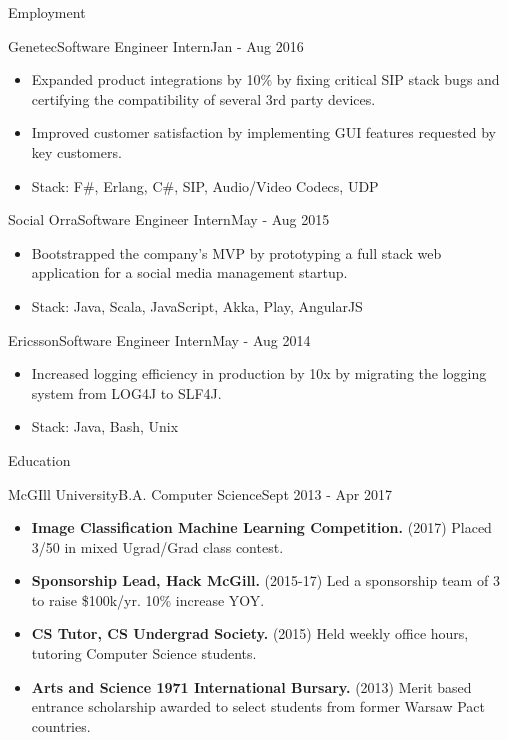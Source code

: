 \documentclass[]{muchicv}
\begin{document}
\begin{cvsection}{Employment}
		\begin{cvsubsection}{Genetec}{Software Engineer Intern}{Jan - Aug 2016}
			\begin{itemize}
				\item Expanded product integrations by 10\% by fixing critical SIP stack bugs and certifying the compatibility of several 3rd party devices.
				\item Improved customer satisfaction by implementing GUI features requested by key customers.
				\item Stack: F\#, Erlang, C\#, SIP, Audio/Video Codecs, UDP
			\end{itemize}
		\end{cvsubsection}

		\begin{cvsubsection}{Social Orra}{Software Engineer Intern}{May - Aug 2015}
			\begin{itemize}
				\item Bootstrapped the company's MVP by prototyping a full stack web application for a social media management startup.
				\item Stack: Java, Scala, JavaScript, Akka, Play, AngularJS
			\end{itemize}
		\end{cvsubsection}
		
		\begin{cvsubsection}{Ericsson}{Software Engineer Intern}{May - Aug 2014}
			\begin{itemize}
				\item Increased logging efficiency in production by 10x by migrating the logging system from LOG4J to SLF4J.
				\item Stack: Java, Bash, Unix
			\end{itemize}
		\end{cvsubsection}
	\end{cvsection}
	
	\begin{cvsection}{Education}
		\begin{cvsubsection}{McGIll University}{B.A. Computer Science}{Sept 2013 - Apr 2017}
			\begin{itemize}
				\item \textbf{Image Classification Machine Learning Competition.} (2017) Placed 3/50 in mixed Ugrad/Grad class contest.
				\item \textbf{Sponsorship Lead, Hack McGill.} (2015-17) Led a sponsorship team of 3 to raise \$100k/yr. 10\% increase YOY.
				\item \textbf{CS Tutor, CS Undergrad Society.} (2015) Held weekly office hours, tutoring Computer Science students.
				\item \textbf{Arts and Science 1971 International Bursary.} (2013) Merit based entrance scholarship awarded to select students from former Warsaw Pact countries.
			\end{itemize}
		\end{cvsubsection}
	\end{cvsection}
	
\end{document}
